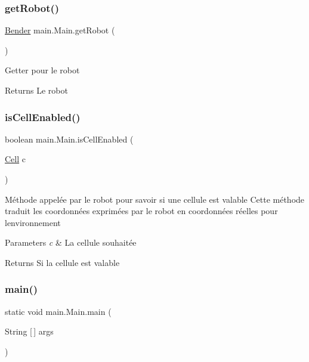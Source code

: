 \subsubsection{\texorpdfstring{get\+Robot()}{getRobot()}}
{\footnotesize\ttfamily \hyperlink{class_i_a_1_1_bender}{Bender} main.\+Main.\+get\+Robot (\begin{DoxyParamCaption}{ }\end{DoxyParamCaption})}

Getter pour le robot \begin{DoxyReturn}{Returns}
Le robot 
\end{DoxyReturn}
\hypertarget{classmain_1_1_main_a5052a776c99a2dadce1fe83501e5860e}{}\label{classmain_1_1_main_a5052a776c99a2dadce1fe83501e5860e} 
\subsubsection{\texorpdfstring{is\+Cell\+Enabled()}{isCellEnabled()}}
{\footnotesize\ttfamily boolean main.\+Main.\+is\+Cell\+Enabled (\begin{DoxyParamCaption}\item[{\hyperlink{classenvironnement_1_1_cell}{Cell}}]{c }\end{DoxyParamCaption})}

Méthode appelée par le robot pour savoir si une cellule est valable Cette méthode traduit les coordonnées exprimées par le robot en coordonnées réelles pour l\textquotesingle{}environnement 
\begin{DoxyParams}{Parameters}
{\em c} & La cellule souhaitée \\
\hline
\end{DoxyParams}
\begin{DoxyReturn}{Returns}
Si la cellule est valable 
\end{DoxyReturn}
\hypertarget{classmain_1_1_main_ab607ced846a257d28e8f81d1820d587c}{}\label{classmain_1_1_main_ab607ced846a257d28e8f81d1820d587c} 
\subsubsection{\texorpdfstring{main()}{main()}}
{\footnotesize\ttfamily static void main.\+Main.\+main (\begin{DoxyParamCaption}\item[{String \mbox{[}$\,$\mbox{]}}]{args }\end{DoxyParamCaption})\hspace{0.3cm}{\ttfamily [static]}}

